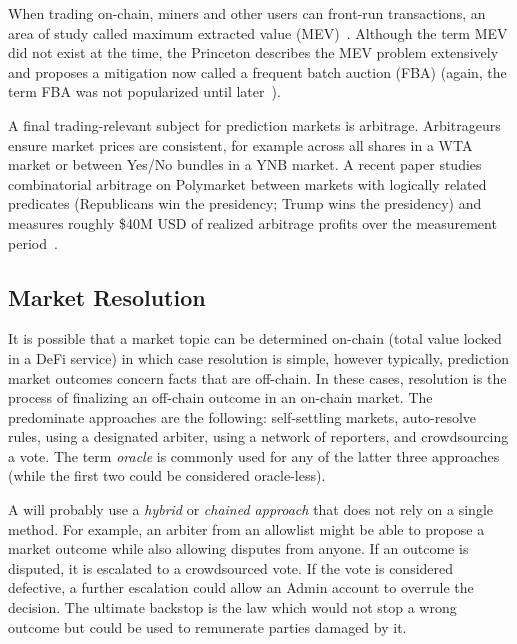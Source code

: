 When trading on-chain, miners and other users can front-run transactions, an area of study called maximum extracted value (MEV)~\cite{BBDGJKLZ19}. Although the term MEV did not exist at the time, the Princeton \depm describes the MEV problem extensively~\cite{BCFKMN14} and proposes a mitigation now called a frequent batch auction (FBA) (again, the term FBA was not popularized until later~\cite{BCS15}).

A final trading-relevant subject for prediction markets is arbitrage. Arbitrageurs ensure market prices are consistent, for example across all shares in a WTA market or between Yes/No bundles in a YNB market. A recent paper studies combinatorial arbitrage on Polymarket between markets with logically related predicates (\eg Republicans win the presidency; Trump wins the presidency) and measures roughly \$40M USD of realized arbitrage profits over the measurement period~\cite{SGKS25}. 



\subsection{Market Resolution}\label{wf:close}

It is possible that a market topic can be determined on-chain (\eg total value locked in a DeFi service) in which case resolution is simple, however typically, prediction market outcomes concern facts that are off-chain. In these cases, resolution is the process of finalizing an off-chain outcome in an on-chain market. The predominate approaches are the following: self-settling markets, auto-resolve rules, using a designated arbiter, using a network of reporters, and crowdsourcing a vote. The term \textit{oracle} is commonly used for any of the latter three approaches (while the first two could be considered oracle-less). 

A \depm will probably use a \textit{hybrid} or \textit{chained approach} that does not rely on a single method. For example, an arbiter from an allowlist might be able to propose a market outcome while also allowing disputes from anyone. If an outcome is disputed, it is escalated to a crowdsourced vote. If the vote is considered defective, a further escalation could allow an Admin account to overrule the decision. The ultimate backstop is the law which would not stop a wrong outcome but could be used to remunerate parties damaged by it.

